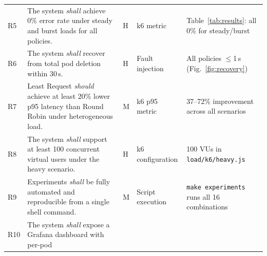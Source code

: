 \documentclass[conference]{IEEEtran}
\begin{document}
\begin{table}[t]
\begin{tabular}{p{0.5cm}p{5.5cm}p{0.7cm}p{2.5cm}p{4.0cm}}
    R5                                                      & The system \textit{shall} achieve 0\% error rate under steady and burst
    loads for all policies.                                 & H                                                                        &
    k6 metric                                               &
    Table~\ref{tab:results}: all 0\% for steady/burst                                                                                                                  \\
    R6                                                      & The system \textit{shall} recover from total pod deletion within 30\,s.  & H   &
    Fault injection                                         &
    All policies $\le$1\,s (Fig.~\ref{fig:recovery})                                                                                                                   \\
    R7                                                      & Least Request \textit{should} achieve at least 20\% lower p95 latency
    than Round Robin under heterogeneous load.              & M                                                                        &
    k6 p95 metric                                           &
    37--72\% improvement across all scenarios                                                                                                                          \\
    R8                                                      & The system \textit{shall} support at least 100 concurrent virtual users
    under the heavy scenario.                               & H                                                                        &
    k6 configuration                                        &
    100 VUs in \texttt{load/k6/heavy.js}                                                                                                                               \\
    R9                                                      & Experiments \textit{shall} be fully automated and reproducible from a
    single shell command.                                   & M                                                                        &
    Script execution                                        &
    \texttt{make experiments} runs all 16 combinations                                                                                                                 \\
    R10                                                     & The system \textit{shall} expose a Grafana dashboard with per-pod

\end{tabular}
\end{table}
\end{document}
